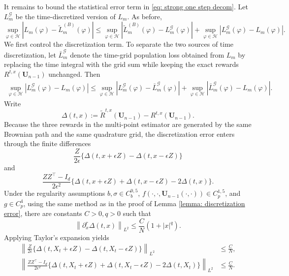\documentclass[twoside,11pt]{article}
\newcommand{\1}{\mathbf{1}}
\numberwithin{equation}{section}
\begin{document}
It remains to bound the statistical error term in \eqref{eq: strong one step decom}. Let $L_m^{\mathscr G}$ be the time-discretized version of $L_m$. As before,
\begin{equation}\label{eq: strong gen decomp}
\sup_{\varphi\in\mathcal H}
\left|L_m(\varphi)-\tilde L_m^{(B)}(\varphi)\right|
\le
\sup_{\varphi\in\mathcal H}
\left|\tilde L_m^{(B)}(\varphi)-L_m^{\mathscr G}(\varphi)\right|
+
\sup_{\varphi\in\mathcal H}
\left|L_m^{\mathscr G}(\varphi)-L_m(\varphi)\right|.
\end{equation}
We first control the discretization term. To separate the two sources of time discretization, let $\bar L_m^{\mathscr G}$ denote the time-grid population loss obtained from $L_m$ by replacing the time integral with the grid sum while keeping the exact rewards $R^{t,x}(\mathbf U_{n-1})$ unchanged. Then
\begin{equation}\label{eq: strong inner outer discretization split}
\begin{aligned}
    \sup_{\varphi\in\mathcal H}
    \left|L_m^{\mathscr G}(\varphi)-L_m(\varphi)\right|
    \le
    \sup_{\varphi\in\mathcal H}
    \left|L_m^{\mathscr G}(\varphi)-\bar L_m^{\mathscr G}(\varphi)\right| +
    \sup_{\varphi\in\mathcal H}
    \left|\bar L_m^{\mathscr G}(\varphi)-L_m(\varphi)\right| .
\end{aligned}
\end{equation}
Write
\[
\Delta(t,x)
:=
\tilde R^{t,x}(\mathbf U_{n-1})
-
R^{t,x}(\mathbf U_{n-1}).
\]
Because the three rewards in the multi-point estimator are generated by the same Brownian path and the same quadrature grid, the discretization error enters through the finite differences
\[
\frac{Z}{2\epsilon}\{\Delta(t,x+\epsilon Z)-\Delta(t,x-\epsilon Z)\}
\]
and
\[
\frac{ZZ^\top-I_d}{2\epsilon^2}
\{\Delta(t,x+\epsilon Z)+\Delta(t,x-\epsilon Z)-2\Delta(t,x)\}.
\]
Under the regularity assumptions $b,\sigma\in C_b^{0,5}$, $f(\cdot,\cdot,\mathbf U_{n-1}(\cdot,\cdot))\in C_p^{1,5}$, and $g\in C_p^4$,
using the same method as in the proof of Lemma \ref{lemma: discretization error}, there are constants $C>0, q>0$ such that
\begin{equation}\label{eq: strong reward discretization derivatives}
    \left\|
    \partial_x^r \Delta(t,x)
    \right\|_{L^2}
    \le \frac{C}{N}(1+|x|^q).
\end{equation}
Applying Taylor's expansion yields
\begin{align}
\left\|
\frac{Z}{2\epsilon}
\{\Delta(t,X_t+\epsilon Z)-\Delta(t,X_t-\epsilon Z)\}
\right\|_{L^2}
&\le \frac{C}{N},\\
\left\|
\frac{ZZ^\top-I_d}{2\epsilon^2}
\{\Delta(t,X_t+\epsilon Z)+\Delta(t,X_t-\epsilon Z)-2\Delta(t,X_t)\}
\right\|_{L^2}
&\le \frac{C}{N}.
\end{align}
\end{document}
